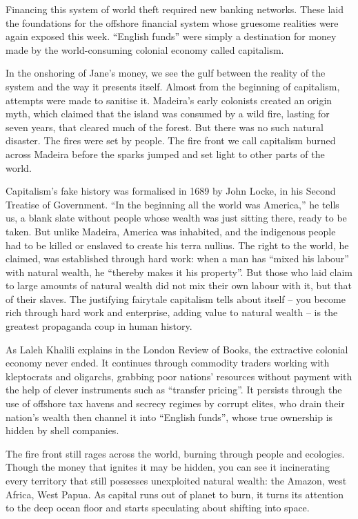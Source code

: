 \documentclass[
]{book}
\begin{document}
Financing this system of world theft required new banking networks. These laid the foundations for the offshore financial system whose gruesome realities were again exposed this week. ``English funds'' were simply a destination for money made by the world-consuming colonial economy called capitalism.

In the onshoring of Jane's money, we see the gulf between the reality of the system and the way it presents itself. Almost from the beginning of capitalism, attempts were made to sanitise it. Madeira's early colonists created an origin myth, which claimed that the island was consumed by a wild fire, lasting for seven years, that cleared much of the forest. But there was no such natural disaster. The fires were set by people. The fire front we call capitalism burned across Madeira before the sparks jumped and set light to other parts of the world.

Capitalism's fake history was formalised in 1689 by John Locke, in his Second Treatise of Government. ``In the beginning all the world was America,'' he tells us, a blank slate without people whose wealth was just sitting there, ready to be taken. But unlike Madeira, America was inhabited, and the indigenous people had to be killed or enslaved to create his terra nullius. The right to the world, he claimed, was established through hard work: when a man has ``mixed his labour'' with natural wealth, he ``thereby makes it his property''. But those who laid claim to large amounts of natural wealth did not mix their own labour with it, but that of their slaves. The justifying fairytale capitalism tells about itself -- you become rich through hard work and enterprise, adding value to natural wealth -- is the greatest propaganda coup in human history.

As Laleh Khalili explains in the London Review of Books, the extractive colonial economy never ended. It continues through commodity traders working with kleptocrats and oligarchs, grabbing poor nations' resources without payment with the help of clever instruments such as ``transfer pricing''. It persists through the use of offshore tax havens and secrecy regimes by corrupt elites, who drain their nation's wealth then channel it into ``English funds'', whose true ownership is hidden by shell companies.

The fire front still rages across the world, burning through people and ecologies. Though the money that ignites it may be hidden, you can see it incinerating every territory that still possesses unexploited natural wealth: the Amazon, west Africa, West Papua. As capital runs out of planet to burn, it turns its attention to the deep ocean floor and starts speculating about shifting into space.
\end{document}
